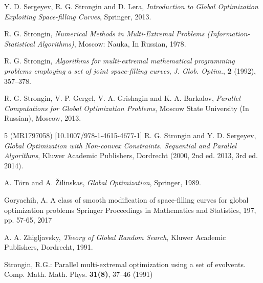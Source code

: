 \documentclass[runningheads]{llncs}
\begin{document}
%
%
% 
% 
%
\begin{thebibliography}{107}

\newblock Y. D. Sergeyev, R. G. Strongin and D. Lera,
\newblock \emph{Introduction to Global Optimization Exploiting Space-filling Curves},
\newblock Springer, 2013.

\newblock R. G. Strongin,
\newblock \emph{Numerical Methods in Multi-Extremal Problems (Information-Statistical Algorithms)},
\newblock Moscow: Nauka, In Russian, 1978.

\newblock R. G. Strongin,
\newblock \emph{\emph{Algorithms for multi-extremal mathematical programming problems employing a set of joint space-filling curves}},
\newblock \emph{J. Glob. Optim.}, \textbf{2} (1992), 357--378.

\newblock R. G. Strongin, V. P. Gergel, V. A. Grishagin and K. A. Barkalov,
\newblock \emph{Parallel Computations for Global Optimization Problems},
\newblock Moscow State University (In Russian), Moscow, 2013.

5 (MR1797058) [10.1007/978-1-4615-4677-1]
\newblock R. G. Strongin and Y. D. Sergeyev,
\newblock \emph{Global Optimization with Non-convex Constraints. Sequential and Parallel Algorithms},
\newblock Kluwer Academic Publishers, Dordrecht (2000, 2nd ed. 2013, 3rd ed. 2014).

\newblock A. T\"orn and A. \v Zilinskas,
\newblock \emph{Global Optimization},
\newblock Springer, 1989.

\newblock Goryachih, A.
\newblock A class of smooth modification of space-filling curves for global optimization problems
\newblock Springer Proceedings in Mathematics and Statistics, 197, pp. 57-65, 2017

\newblock A. A. Zhigljavsky,
\newblock \emph{Theory of Global Random Search},
\newblock Kluwer Academic Publishers, Dordrecht, 1991.

Strongin, R.G.: Parallel multi-extremal optimization using a set of evolvents. Comp. Math. Math. Phys. \textbf{31(8)}, 37--46 (1991)


\end{thebibliography}
\end{document}

